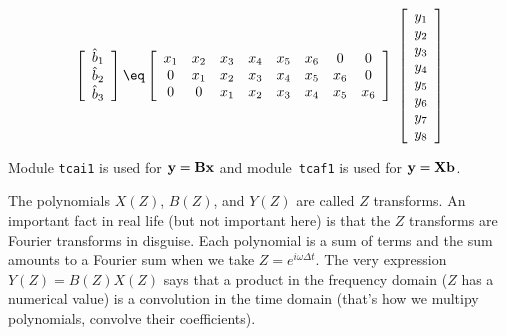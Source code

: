 \begin{equation}
\left[ 
\begin{array}{c}
\hat  b_1 \\ 
\hat  b_2 \\ 
\hat  b_3
  \end{array} \right] 
\eq
\left[ 
\begin{array}{cccccccc}
  x_1 & x_2 & x_3 & x_4 & x_5 & x_6 & 0   & 0   \\
  0   & x_1 & x_2 & x_3 & x_4 & x_5 & x_6 & 0   \\
  0   & 0   & x_1 & x_2 & x_3 & x_4 & x_5 & x_6   
  \end{array} \right] 
\; \left[ 
\begin{array}{c}
  y_1 \\ 
  y_2 \\ 
  y_3 \\ 
  y_4 \\ 
  y_5 \\ 
  y_6 \\ 
  y_7 \\ 
  y_8
  \end{array} \right]
\label{eqn:ajtcontran2}
\end{equation}
\par
Module \texttt{tcai1}
is used for
$\bold y = \bold B \bold x$
and module~\texttt{tcaf1}
is used for
$\bold y = \bold X \bold b$.

\par
The polynomials 
$X(Z)$,
$B(Z)$, and
$Y(Z)$
are called $Z$ transforms.
An important fact in real life
(but not important here)
is that the $Z$ transforms are
Fourier transforms in disguise.
Each polynomial is a sum of terms
and the sum
amounts to a Fourier sum when we take $Z=e^{i\omega\Delta t}$.
The very expression
$Y(Z)=B(Z)X(Z)$ says that a product in the frequency domain
($Z$ has a numerical value) is a convolution in the time domain
(that's how we multipy polynomials, convolve their coefficients).

 
